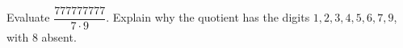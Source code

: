 Evaluate $\dfrac{777777777}{7\cdot9}$. Explain why the quotient has the digits $1,2,3,4,5,6,7,9$, with $8$ absent.
